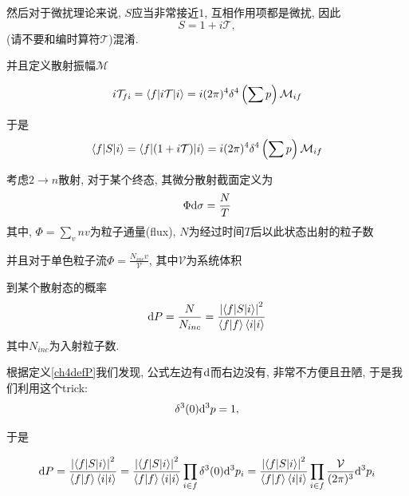 然后对于微扰理论来说, $S$应当非常接近$1$, 互相作用项都是微扰, 因此
\begin{equation}
    S=1+i\mathcal T,
\end{equation}
(请不要和编时算符$\mathcal T$)混淆.

并且定义散射振幅$\mathcal M$
\begin{definition}
    \begin{equation}
        i\mathcal T_{fi}=\braket{f|i\mathcal T|i}=i(2\pi)^{4}\delta^4\left(\sum p\right) \mathcal M_{if}
    \end{equation}
\end{definition}

于是
\begin{equation}
    \braket{f|S|i}=\braket{f|(1+i\mathcal T)|i}=i(2\pi)^{4}\delta^4\left(\sum p\right)\mathcal M_{if}
\end{equation}

\begin{definition}\label{cross-section-def}
    考虑$2\rightarrow n$散射, 对于某个终态, 其微分散射截面定义为
    \begin{equation}
        \Phi\mathrm d\sigma=\frac NT
    \end{equation}
    其中, $\Phi=\sum_v nv$为粒子通量(flux), $N$为经过时间$T$后以此状态出射的粒子数

    并且对于单色粒子流$\Phi=\frac{N_{inc}v}{\mathcal V}$, 其中$\mathcal V$为系统体积
\end{definition}

\begin{definition}\label{ch4defP}
    到某个散射态的概率
    \begin{equation}
        \mathrm d P=\frac N{N_{inc}}=\frac{\left|\braket{f|S|i}\right|^2}{\braket{f|f}\braket{i|i}}
    \end{equation}
    其中$N_{inc}$为入射粒子数.
\end{definition}

根据定义\ref{ch4defP}我们发现, 公式左边有$\mathrm d$而右边没有, 非常不方便且丑陋, 于是我们利用这个trick:
\begin{equation}
    \delta^3(0)\mathrm d^3p=1,
\end{equation}

于是
\begin{theorem}
    \begin{equation}
        \mathrm d P=\frac{\left|\braket{f|S|i}\right|^2}{\braket{f|f}\braket{i|i}}=\frac{\left|\braket{f|S|i}\right|^2}{\braket{f|f}\braket{i|i}}\prod_{i\in f} \delta^3(0)\mathrm d^3p_i=\frac{\left|\braket{f|S|i}\right|^2}{\braket{f|f}\braket{i|i}}\prod_{i\in f} \frac{\mathcal V}{(2\pi)^{3}}\mathrm d^3p_i
    \end{equation}
\end{theorem}

